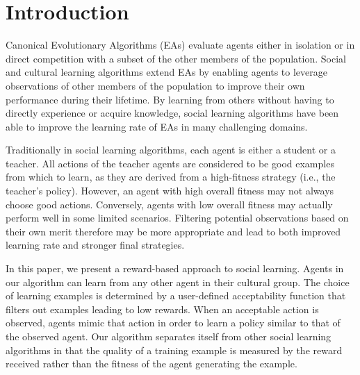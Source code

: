 \documentclass{acm_proc_article-sp}
\begin{document}
\section{Introduction}

Canonical Evolutionary Algorithms (EAs) \cite{fogel1966artificial} evaluate agents either in isolation or in direct competition with a subset of the other members of the population. Social and cultural learning algorithms \cite{reynolds1994introduction} extend EAs by enabling agents to leverage observations of other members of the population to improve their own performance during their lifetime. By learning from others without having to directly experience or acquire knowledge, social learning algorithms have been able to improve the learning rate of EAs in many challenging domains.

Traditionally in social learning algorithms, each agent is either a student or a teacher. All actions of the teacher agents are considered to be good examples from which to learn, as they are derived from a high-fitness strategy (i.e., the teacher's policy). However, an agent with high overall fitness may not always choose good actions. Conversely, agents with low overall fitness may actually perform well in some limited scenarios. Filtering potential observations based on their own merit therefore may be more appropriate and lead to both improved learning rate and stronger final strategies.

In this paper, we present a reward-based approach to social learning. Agents in our algorithm can learn from any other agent in their cultural group. The choice of learning examples is determined by a user-defined acceptability function that filters out examples leading to low rewards. When an acceptable action is observed, agents mimic that action in order to learn a policy similar to that of the observed agent. Our algorithm separates itself from other social learning algorithms in that the quality of a training example is measured by the reward received rather than the fitness of the agent generating the example.

\end{document}
